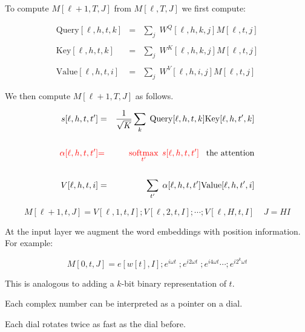 {

To compute {\color{red} $M[\ell+1,T,J]$} from {\color{red} $M[\ell,T,J]$} we first compute:
      
\begin{eqnarray*}
\mathrm{Query}[\ell,h,t,k] & = & \sum_j\;W^Q[\ell,h,k,j]M[\ell,t,j] \\
\\
\mathrm{Key}[\ell,h,t,k] & = & \sum_j\;W^K[\ell,h,k,j]M[\ell,t,j] \\
\\
\mathrm{Value}[\ell,h,t,i] & = & \sum_j\;W^V[\ell,h,i,j]M[\ell,t,j]
\end{eqnarray*}


We then compute {\color{red} $M[\ell+1,T,J]$} as follows.

{\color{red}
\begin{eqnarray*}
s[\ell,h,t,t'] & = &\frac{1}{\sqrt{K}} \sum_k\;\mathrm{Query}[\ell,h,t,k]\mathrm{Key}[\ell,h,t',k] \\
\\
{\color{red} \alpha[\ell,h,t,t']} & {\color{red} =} & {\color{red} \operatorname*{softmax}_{t'} \;s[\ell,h,t,t']}\;\;\;\mbox{the attention} \\
\\
V[\ell,h,t,i] & = & \sum_{t'}\;\alpha[\ell,h,t,t']\mathrm{Value}[\ell,h,t',i]
\end{eqnarray*}
}

{\color{red} $$M[\ell+1,t,J] = V[\ell,1,t,I];V[\ell,2,t,I];\cdots;V[\ell,H,t,I] \;\;\;\; J = HI$$}


At the input layer we augment the word embeddings with position information. For example:

\vfill
{\color{red} $$M[0,t,J] = e[w[t],I];e^{i\omega t}\;;e^{i2\omega t}\;;e^{i4\omega t}\cdots;e^{i2^k\omega t}$$}

\vfill
This is analogous to adding a $k$-bit binary representation of $t$.

\vfill
Each complex number can be interpreted as a pointer on a dial.

\vfill
Each dial rotates twice as fast as the dial before.


}
